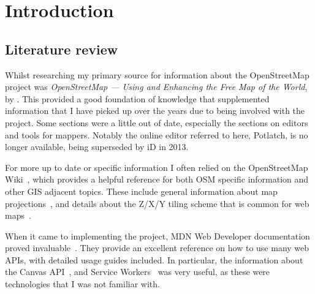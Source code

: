 \documentclass{final_report}
\begin{document}


\chapter{Introduction}




\section{Literature review}

Whilst researching my primary source for information about the OpenStreetMap project was \emph{OpenStreetMap — Using and Enhancing the Free Map of the World}, by \textcite{RAMM:2011}. This provided a good foundation of knowledge  that supplemented information that I have picked up over the years due to being involved with the project. Some sections were a little out of date, especially the sections on editors and tools for mappers. Notably the online editor referred to here, Potlatch, is no longer available, being superseded by iD in 2013.

For more up to date or specific information I often relied on the OpenStreetMap Wiki~\cite{osm-wiki}, which provides a helpful reference for both OSM specific information and other GIS adjacent topics. These include general information about map projections~\cite{osm-wiki-mercator}, and details about the Z/X/Y tiling scheme that is common for web maps~\cite{osm-wiki-tile-names}.

When it came to implementing the project, MDN Web Developer documentation proved invaluable~\cite{mdn}. They provide an excellent reference on how to use many web APIs, with detailed usage guides included. In particular, the information about the Canvas API~\cite{mdn-canvas-api}, and Service Workers~\cite{mdn-service-workers} was very useful, as these were technologies that I was not familiar with.
\end{document}
